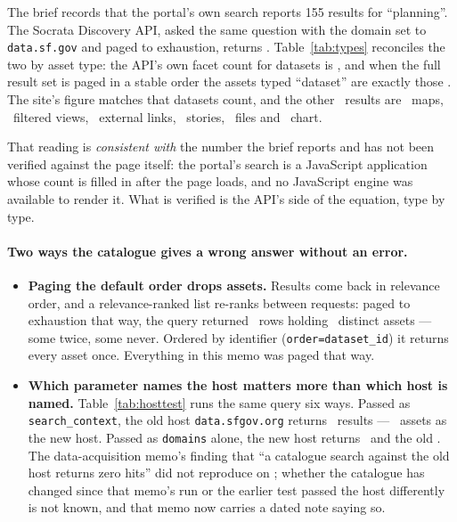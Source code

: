 \documentclass[11pt]{article}
\begin{document}
The brief records that the portal's own search reports 155 results for ``planning''. The
Socrata Discovery API, asked the same question with the domain set to \texttt{data.sf.gov}
and paged to exhaustion, returns \textbf{\catApiTotal}. Table~\ref{tab:types} reconciles the
two by asset type: the API's own facet count for datasets is \catDatasets, and when the full
result set is paged in a stable order the assets typed ``dataset'' are exactly those
\catDatasets. The site's figure matches that datasets count, and the other
\catNonDatasets\ results are \catMaps\ maps, \catFilters\ filtered views, \catLinks\
external links, \catStories\ stories, \catFiles\ files and \catCharts\ chart.

That reading is \emph{consistent with} the number the brief reports and has not been
verified against the page itself: the portal's search is a JavaScript application whose
count is filled in after the page loads, and no JavaScript engine was available to render
it. What is verified is the API's side of the equation, type by type.



\paragraph{Two ways the catalogue gives a wrong answer without an error.}
\begin{itemize}
\item \textbf{Paging the default order drops assets.} Results come back in relevance order,
and a relevance-ranked list re-ranks between requests: paged to exhaustion that way, the
query returned \catRelPagingRows\ rows holding \catRelPagingDistinct\ distinct assets ---
some twice, some never. Ordered by identifier
(\texttt{order=dataset\_id}) it returns every asset once. Everything in this memo was paged
that way.
\item \textbf{Which parameter names the host matters more than which host is named.}
Table~\ref{tab:hosttest} runs the same query six ways. Passed as \texttt{search\_context},
the old host \texttt{data.sfgov.org} returns \catOldHostCount\ results --- \catOldHostSameIds\
assets as the new host. Passed as \texttt{domains} alone, the new host returns \catDomainsOnly\ and the old
\catDomainsOnlyOld. The data-acquisition memo's finding that ``a catalogue search against the
old host returns zero hits'' did not reproduce on \catRetrieved; whether the catalogue has
changed since that memo's run or the earlier test passed the host differently is not known,
and that memo now carries a dated note saying so.
\end{itemize}
\end{document}
